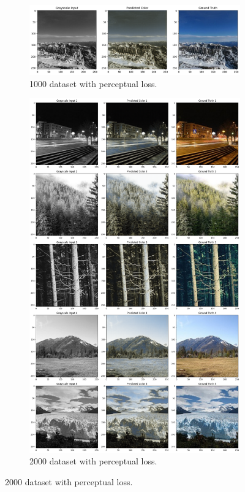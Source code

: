 \documentclass[conference]{IEEEtran}
\begin{document}
\begin{figure}[t]
    \centering
    \begin{subfigure}{\columnwidth}
        \centering
        \includegraphics[width=\linewidth]{3_1000dataset_with_perceptual_loss_result.png}
        \caption{1000 dataset with perceptual loss.}
        \label{fig:1000_perceptual}
    \end{subfigure}
    \hfill
    \begin{subfigure}{\columnwidth}
        \centering
        \includegraphics[width=\linewidth]{5_2000dataset_with_perceptual_loss_result.png}
        \caption{2000 dataset with perceptual loss.}
        \label{fig:2000_perceptual}
    \end{subfigure}


\end{figure}
\end{document}

